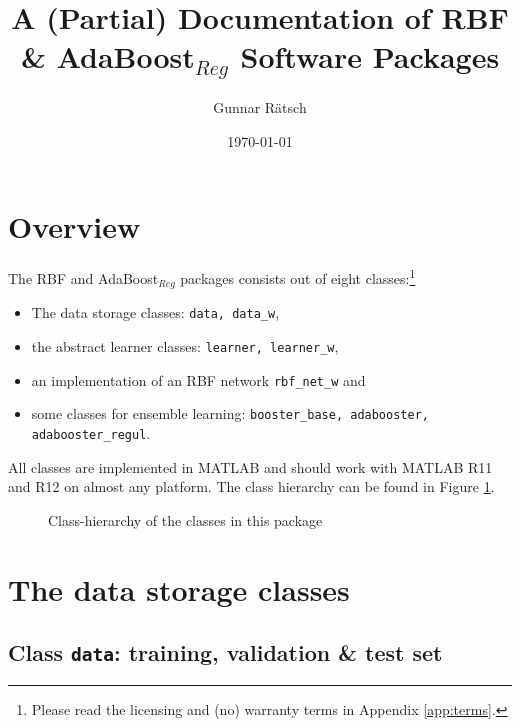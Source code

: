 \documentclass{article}
\title{A (Partial) Documentation of RBF \& AdaBoost$_{Reg}$ Software Packages}
\author{Gunnar R\"atsch}
\date{\today}
\begin{document}
\maketitle

\section{Overview}
The RBF and AdaBoost$_{Reg}$ packages consists out of eight
classes:\footnote{Please read the licensing and (no) warranty terms in
  Appendix \ref{app:terms}.}
\begin{itemize}
\item The data storage classes: {\tt data, data\_w},
\item the abstract learner classes: {\tt learner, learner\_w},
\item an implementation of an RBF network {\tt rbf\_net\_w} and
\item some classes for ensemble learning: {\tt booster\_base, adabooster, adabooster\_regul}.
\end{itemize}
All classes are implemented in MATLAB and should work with MATLAB R11 and R12
on almost any platform. The class hierarchy can be found in Figure
\ref{fig:hier}.
\begin{figure}[h]
\begin{center}
\end{center}
\caption{\label{fig:hier} Class-hierarchy of the classes in this package}
\end{figure}

\section{The data storage classes}

\subsection{Class {\tt data}: training, validation \& test set}
\end{document}
